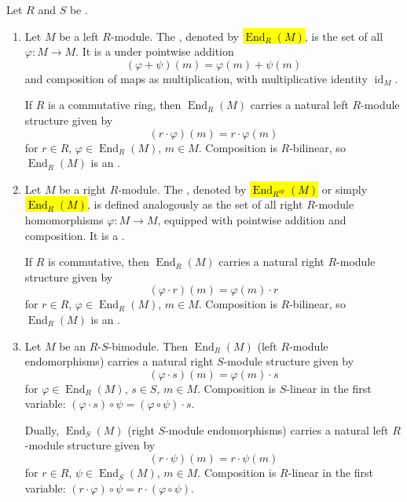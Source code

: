 \begin{definition} \label{definition:endomorphism_ring_of_a_module_over_a_ring}
    Let $R$ and $S$ be .
    \begin{enumerate}
        \item Let $M$ be a left $R$-module. The , denoted by \hl{$\operatorname{End}_R(M)$}, is the set of all  $\varphi: M \to M$. It is a  under pointwise addition
        $$ (\varphi + \psi)(m) = \varphi(m) + \psi(m) $$
        and composition of maps as multiplication, with multiplicative identity $\operatorname{id}_M$.

        If $R$ is a commutative ring, then $\operatorname{End}_R(M)$ carries a natural left $R$-module structure given by
        $$ (r \cdot \varphi)(m) = r \cdot \varphi(m) $$
        for $r \in R$, $\varphi \in \operatorname{End}_R(M)$, $m \in M$. Composition is $R$-bilinear, so $\operatorname{End}_R(M)$ is an .

        \item Let $M$ be a right $R$-module. The , denoted by \hl{$\operatorname{End}_{R^{\mathrm{op}}}(M)$} or simply \hl{$\operatorname{End}_R(M)$}, is defined analogously as the set of all right $R$-module homomorphisms $\varphi: M \to M$, equipped with pointwise addition and composition. It is a .

        If $R$ is commutative, then $\operatorname{End}_R(M)$ carries a natural right $R$-module structure given by
        $$ (\varphi \cdot r)(m) = \varphi(m) \cdot r $$
        for $r \in R$, $\varphi \in \operatorname{End}_R(M)$, $m \in M$. Composition is $R$-bilinear, so $\operatorname{End}_R(M)$ is an .

        \item Let $M$ be an $R$-$S$-bimodule. Then $\operatorname{End}_R(M)$ (left $R$-module endomorphisms) carries a natural right $S$-module structure given by
        $$ (\varphi \cdot s)(m) = \varphi(m) \cdot s $$
        for $\varphi \in \operatorname{End}_R(M)$, $s \in S$, $m \in M$. Composition is $S$-linear in the first variable: $(\varphi \cdot s) \circ \psi = (\varphi \circ \psi) \cdot s$.

        Dually, $\operatorname{End}_S(M)$ (right $S$-module endomorphisms) carries a natural left $R$-module structure given by
        $$ (r \cdot \psi)(m) = r \cdot \psi(m) $$
        for $r \in R$, $\psi \in \operatorname{End}_S(M)$, $m \in M$. Composition is $R$-linear in the first variable: $(r \cdot \varphi) \circ \psi = r \cdot (\varphi \circ \psi)$.
    \end{enumerate}
\end{definition}
